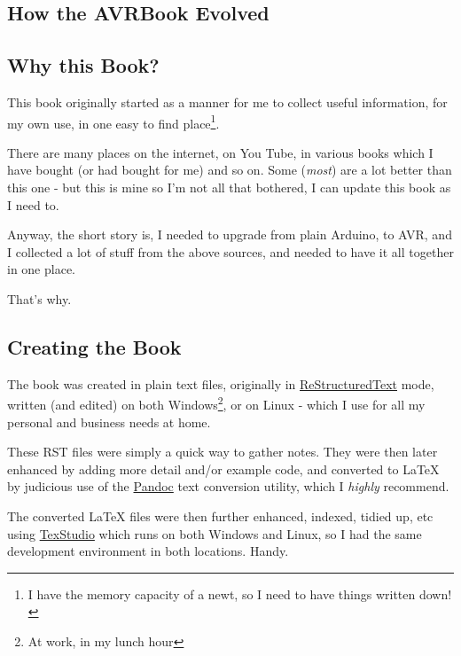 \begin{appendix}

\chapter{How the AVRBook Evolved}
\label{appendix-a-how-it-was-done}

\section*{Why this Book?}\label{why-this-book}

This book originally started as a manner for me to collect useful information, for my own use, in one easy to find place\footnote{I have the memory capacity of a newt, so I need to have things written down!}.

There are many places on the internet, on You Tube, in various books which I have bought (or had bought for me) and so on. Some (\emph{most}) are a lot better than this one - but this is mine so I'm not all that bothered, I can update this book as I need to.

Anyway, the short story is, I needed to upgrade from plain Arduino, to AVR, and I collected a lot of stuff from the above sources, and needed to have it all together in one place.

That's why.

\section*{Creating the Book}\label{creating-the-book}

The book was created in plain text files, originally in \href{https://en.wikipedia.org/wiki/ReStructuredText}{ReStructuredText} mode, written (and edited) on both Windows\footnote{At work, in my lunch hour}, or on Linux - which I use for all my personal and business needs at home.

These RST files were simply a quick way to gather notes. They were then later enhanced by adding more detail and/or example code, and converted to \LaTeX{} by judicious use of the \href{https://pandoc.org/}{Pandoc} text conversion utility, which I \emph{highly} recommend.

The converted \LaTeX{} files were then further enhanced, indexed, tidied up, etc using \href{http://www.texstudio.org/}{TexStudio} which runs on both Windows and Linux, so I had the same development environment in both locations. Handy. 


\end{appendix}
